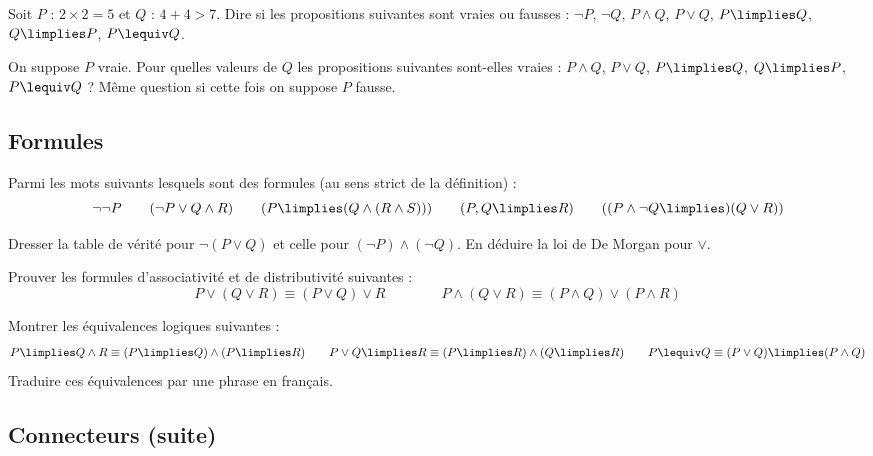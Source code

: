 \documentclass[11pt,class=report,crop=false]{standalone}
\begin{document}
\begin{exercicecours}
	Soit $P$ : \og{}$2 \times 2 = 5$\fg{} et $Q$ : \og{}$4+4 > 7$\fg{}.
	Dire si les propositions suivantes sont vraies ou fausses :
	$\lnot P$, $\lnot Q$, $P \land Q$, $P \lor Q$, $P \limplies Q$, $Q \limplies P$, $P \lequiv Q$.
\end{exercicecours}

\begin{exercicecours}
	On suppose $P$ vraie. Pour quelles valeurs de $Q$ les propositions suivantes sont-elles vraies : $P \land Q$, $P \lor Q$, $P \limplies Q$, $Q \limplies P$, $P \lequiv Q$ ? Même question si cette fois on suppose $P$ fausse.
\end{exercicecours}


\subsection*{Formules}

\begin{exercicecours}
Parmi les mots suivants lesquels sont des formules (au sens strict de la définition) :
\[\lnot \lnot P\qquad (\lnot P \lor Q \land R) \qquad (P \limplies (Q  \land (R \land S))) \qquad (P, Q \limplies R) \qquad ( (P \land \lnot Q \limplies) (Q \lor R))
\]	
\end{exercicecours}

\begin{exercicecours}
	Dresser la table de vérité pour $\lnot(P \lor Q)$ et celle pour $(\lnot P) \land (\lnot Q)$. En déduire la loi de De Morgan pour $\lor$. 
\end{exercicecours}

\begin{exercicecours}
	Prouver les formules d'associativité et de distributivité suivantes :
	\[ P \lor (Q \lor R) \equiv (P \lor Q) \lor R \qquad \qquad
	P \land (Q \lor R) \equiv (P \land Q) \lor (P \land R) \] 
\end{exercicecours}

\begin{exercicecours}
	Montrer les équivalences logiques suivantes :
	\[
	P \limplies Q \land R \equiv (P \limplies Q) \land (P \limplies R) \qquad
	P \lor Q \limplies R \equiv (P \limplies R) \land (Q \limplies R) \qquad
	P \lequiv Q \equiv (P \lor Q) \limplies (P \land Q)
	\]
	Traduire ces équivalences par une phrase en français.
\end{exercicecours}


\subsection*{Connecteurs (suite)}
\end{document}
